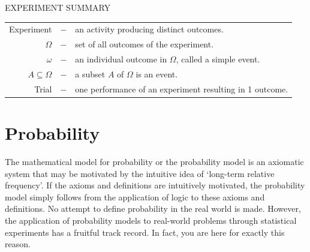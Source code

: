 \begin{framed}
EXPERIMENT SUMMARY\\

\begin{tabular}{rcl}
Experiment &$-$& an activity producing distinct outcomes.\\
$\Omega$ &$-$& set of all outcomes of the experiment.\\
$\omega$ &$-$& an individual outcome in $\Omega$, called a simple event.\\
$A\subseteq \Omega$ &$-$& a subset $A$ of $\Omega$ is an event.\\
Trial &$-$& one performance of an experiment resulting in 1 outcome.\\
\end{tabular}
\end{framed}


\section{Probability}\label{S:Probability}
The  mathematical model for probability or the probability model is an axiomatic system that may be motivated by the intuitive idea of `long-term relative frequency'.  If the axioms and definitions are intuitively motivated, the probability model simply follows from the application of logic to these axioms and definitions.  No attempt to define probability in the real world is made. However, the application of probability models to real-world problems through statistical experiments has a fruitful track record.  In fact, you are here for exactly this reason.

